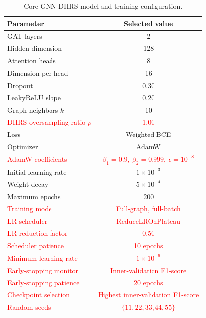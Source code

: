 \documentclass[pdflatex,sn-mathphys-num]{sn-jnl}%
\theoremstyle{thmstyleone}%
\theoremstyle{thmstyletwo}%
\theoremstyle{thmstylethree}%
\begin{document}
\begin{table}[!ht]
\centering
\caption{Core GNN-DHRS model and training configuration.}
\label{tab:gat_configuration}

\small
\setlength{\tabcolsep}{5pt}
\renewcommand{\arraystretch}{1.05}

\begin{tabular}{@{}lc@{}}
\toprule
\textbf{Parameter} & \textbf{Selected value} \\
\midrule

GAT layers & 2 \\
Hidden dimension & 128 \\
Attention heads & 8 \\
Dimension per head & 16 \\
Dropout & 0.30 \\
LeakyReLU slope & 0.20 \\
Graph neighbors \(k\) & 10 \\

\textcolor{red}{DHRS oversampling ratio \(\rho\)}
& \textcolor{red}{1.00} \\

Loss & Weighted BCE \\
Optimizer & AdamW \\

\textcolor{red}{AdamW coefficients}
& \textcolor{red}{\(\beta_1=0.9,\ \beta_2=0.999,\ \epsilon=10^{-8}\)} \\

Initial learning rate & \(1\times10^{-3}\) \\
Weight decay & \(5\times10^{-4}\) \\
Maximum epochs & 200 \\

\textcolor{red}{Training mode}
& \textcolor{red}{Full-graph, full-batch} \\

\textcolor{red}{LR scheduler}
& \textcolor{red}{ReduceLROnPlateau} \\

\textcolor{red}{LR reduction factor}
& \textcolor{red}{0.50} \\

\textcolor{red}{Scheduler patience}
& \textcolor{red}{10 epochs} \\

\textcolor{red}{Minimum learning rate}
& \textcolor{red}{\(1\times10^{-6}\)} \\

\textcolor{red}{Early-stopping monitor}
& \textcolor{red}{Inner-validation F1-score} \\

\textcolor{red}{Early-stopping patience}
& \textcolor{red}{20 epochs} \\

\textcolor{red}{Checkpoint selection}
& \textcolor{red}{Highest inner-validation F1-score} \\

\textcolor{red}{Random seeds}
& \textcolor{red}{\(\{11,22,33,44,55\}\)} \\

\bottomrule
\end{tabular}
\end{table}
\end{document}
